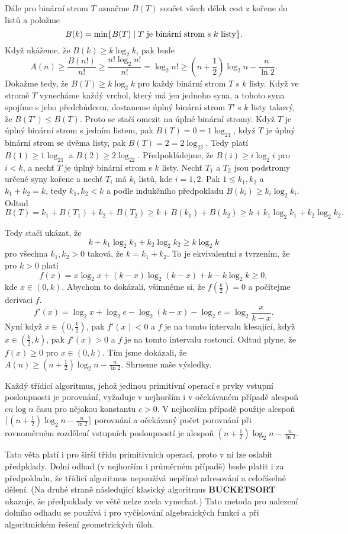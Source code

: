 \documentclass[a4paper,12pt]{article}
\begin{document}
Dále pro binární strom $T$ označme $B(T)$ součet všech 
délek cest z kořene do listů a položme 
$$B(k)=\min\{B(T)\mid T\text{\rm\ je binární strom s $k$ listy}
\}.$$
Když ukážeme, že $B(k)\ge k\log_2k$, pak bude 
$$A(n)\ge\frac {B(n!)}{n!}\ge\frac {n!\log_2n!}{n!}=\log_2n!\ge (
n+\frac 12)\log_2n-\frac n{\ln2}.$$
Dokažme tedy, že $B(T)\ge k\log_2k$ pro každý binární 
strom $T$ s $k$ listy. Když ve stromě $T$ vynecháme každý 
vrchol, který má jen jednoho syna, a tohoto syna spojíme 
s jeho předchůdcem, dostaneme úplný binární 
strom $T'$ s $k$ listy tako\-vý, že $B(T')\le B(T)$. Proto se stačí  
omezit na úplné binární stromy. Když $T$ je úplný 
binární strom s jedním listem, pak $B(T)=0=1\log_21$, 
když $T$ je úplný binární strom se dvěma listy, pak 
$B(T)=2=2\log_22$. Tedy platí $B(1)\ge 1\log_21$ a $B(2)\ge 2\log_
22$. 
Předpokládejme, že $B(i)\ge i\log_2i$ pro $i<k$, a nechť $
T$ je 
úplný binární strom s $k$ listy. Nechť $T_1$ a $T_2$ jsou 
podstromy určené syny kořene a nechť $T_i$ má $k_i$ 
listů, kde $i=1,2$. Pak $1\le k_1,k_2$ a $k_1+k_2=k$, tedy 
$k_1,k_2<k$ a podle indukčního předpokladu $B(k_i)\ge k_
i\log_2k_i$. 
Odtud 
$$B(T)=k_1+B(T_1)+k_2+B(T_2)\ge k+B(k_1)+B(k_2)\ge k+k_1\log_2k_1
+k_2\log_2k_2.$$

Tedy stačí ukázat, že 
$$k+k_1\log_2k_1+k_2\log_2k_2\ge k\log_2k$$
pro všechna $k_1,k_2>0$ taková, že $k=k_1+k_2$. To je 
ekvivalentní s tvrzením, že pro $k>0$ platí 
$$f(x)=x\log_2x+(k-x)\log_2(k-x)+k-k\log_2k\ge 0,$$
kde $x\in (0,k)$. 
Abychom to dokázali, všimněme si, že $f(\frac k2)=0$ a  
počí\-tejme derivaci $f$.
$$f'(x)=\log_2x+\log_2e-\log_2(k-x)-\log_2e=\log_2\frac x{k-x}.$$
Nyní když $x\in (0,\frac k2)$, pak $f'(x)<0$ a $f$ je na tomto intervalu 
klesající, když $x\in (\frac k2,k)$, pak $f'(x)>0$ a $
f$ je na tomto 
intervalu rostoucí. Odtud plyne, že $f(x)\ge 0$ pro $x\in 
(0,k)$.
Tím jsme dokázali, že $A(n)\ge (n+\frac 12)\log_2n-\frac 
n{\ln2}$. Shrneme 
naše výsledky.

\begin{veta}Každý třídicí algoritmus, jehož jedinou 
primitivní ope\-rací s prvky vstupní posloupnosti je 
porovnání, vyžaduje v nejhorším i v očekávaném případě 
alespoň $cn\log n$ času pro nějakou konstantu $c>0$.  V 
nejhorším případě použije alespoň $\lceil 
(n+\frac 12)\log_2n-\frac n{\ln2}\rceil$ 
porovnání a očekávaný počet porovnání při rovnoměrném 
rozdělení vstupních posloupností je alespoň 
$(n+\frac 12)\log_2n-\frac n{\ln2}$.  
\end{veta}

Tato věta 
platí i pro širší třídu primitivních operací, proto v ní 
lze oslabit předpklady. 
Dolní odhad (v nejhorším i průměrném případě) 
bude platit i za 
před\-pokladu, že třídicí algoritmus nepoužívá nepřímé 
adreso\-vání a celo\-číselné dělení. 
(Na druhé straně následující klasický algoritmus 
{\bf BUCKETSORT} ukazuje, že před\-poklady
ve větě nelze zcela vynechat.) 
Tato metoda pro 
nalezení dolního odhadu se používá i pro vyčíslování 
algebraických funkcí a při algoritmickém řešení 
geometrických úloh.
\end{document}
